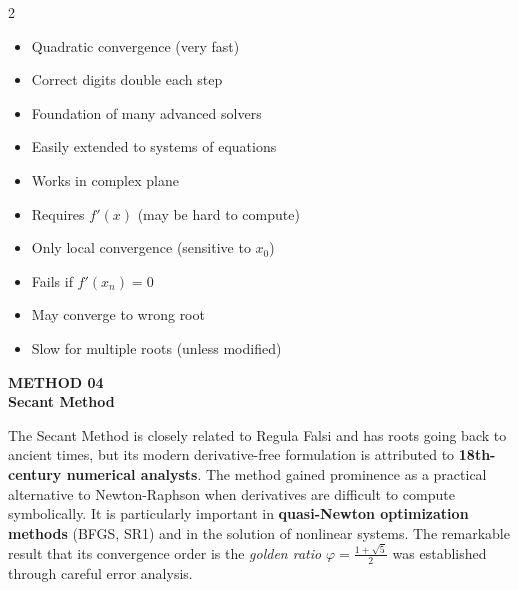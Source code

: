 \documentclass[12pt]{article}
\begin{document}
\begin{multicols}{2}
\begin{prosbox}
\begin{itemize}[noitemsep]
  \item Quadratic convergence (very fast)
  \item Correct digits double each step
  \item Foundation of many advanced solvers
  \item Easily extended to systems of equations
  \item Works in complex plane
\end{itemize}
\end{prosbox}

\columnbreak

\begin{consbox}
\begin{itemize}[noitemsep]
  \item Requires $f'(x)$ (may be hard to compute)
  \item Only local convergence (sensitive to $x_0$)
  \item Fails if $f'(x_n) = 0$
  \item May converge to wrong root
  \item Slow for multiple roots (unless modified)
\end{itemize}
\end{consbox}
\end{multicols}

\newpage


\begin{tcolorbox}[
  enhanced, arc=0pt, boxrule=0pt,
  colback=primary, colframe=primary,
  left=16pt, right=16pt, top=14pt, bottom=10pt,
  borderline south={4pt}{0pt}{accent},
]
  {\color{accent!70}\small\bfseries METHOD 04}\\[4pt]
  {\LARGE\bfseries\color{white} Secant Method}
\end{tcolorbox}

\vspace{10pt}

\begin{histbox}
The Secant Method is closely related to Regula Falsi and has roots going back to ancient times, but its modern derivative-free formulation is attributed to \textbf{18th-century numerical analysts}. The method gained prominence as a practical alternative to Newton-Raphson when derivatives are difficult to compute symbolically. It is particularly important in \textbf{quasi-Newton optimization methods} (BFGS, SR1) and in the solution of nonlinear systems. The remarkable result that its convergence order is the \textit{golden ratio} $\varphi = \frac{1+\sqrt{5}}{2}$ was established through careful error analysis.
\end{histbox}
\end{document}
